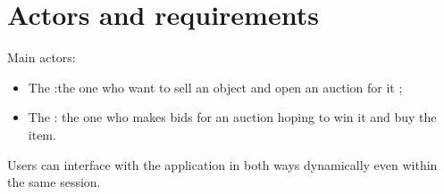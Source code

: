 \chapter{Actors and requirements}\label{ch:requirements}

Main actors:
\begin{itemize}
	\item The :the one who want to     sell an object and open an auction for it ;
	\item The : the one who makes bids for an auction hoping to win it and buy the item.
\end{itemize}

Users can interface with the application in both ways dynamically even within the same session.



